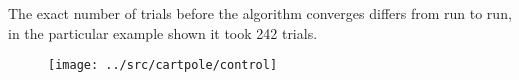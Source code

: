 \begin{answer}
The exact number of trials before the algorithm converges differs from run to run, in the particular example shown it took 242 trials.
\begin{figure}
    \centering
    \texttt{[image: ../src/cartpole/control]}
\end{figure}    
\end{answer}
